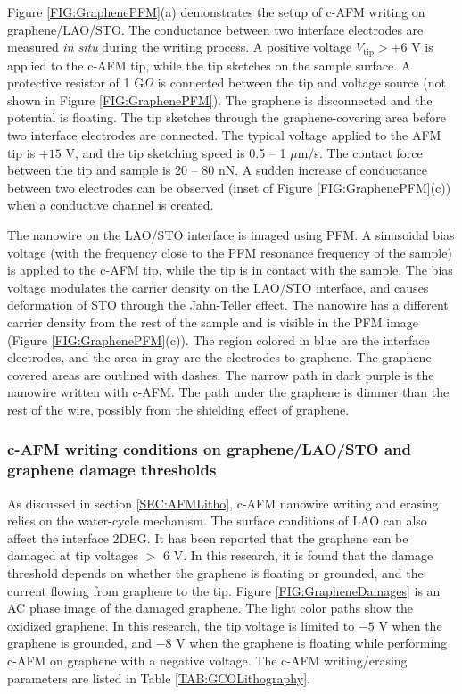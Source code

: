 \documentclass[pdflatex, sectionletters, 12pt, final, phd]{pittetd}    %
\begin{document}
Figure \ref{FIG:GraphenePFM}(a) demonstrates the setup of c-AFM writing on graphene/LAO/STO. The conductance between two interface electrodes are measured \textit{in situ} during the writing process. A positive voltage $V_\mathrm{tip} > +6$ V is applied to the c-AFM tip, while the tip sketches on the sample surface. A protective resistor of 1 G$\Omega$ is connected between the tip and voltage source (not shown in Figure \ref{FIG:GraphenePFM}). The graphene is disconnected and the potential is floating. The tip sketches through the graphene-covering area before two interface electrodes are connected. The typical voltage applied to the AFM tip is $+15$ V, and the tip sketching speed is 0.5 -- 1 $\mu$m/s. The contact force between the tip and sample is 20 -- 80 nN. A sudden increase of conductance between two electrodes can be observed (inset of Figure \ref{FIG:GraphenePFM}(c)) when a conductive channel is created. 

The nanowire on the LAO/STO interface is imaged using PFM. A sinusoidal bias voltage (with the frequency close to the PFM resonance frequency of the sample) is applied to the c-AFM tip, while the tip is in contact with the sample. The bias voltage modulates the carrier density on the LAO/STO interface, and causes deformation of STO through the Jahn-Teller effect\cite{huang2013direct, vonk2007interface, salluzzo2009orbital, park2006charge}. The nanowire has a different carrier density from the rest of the sample and is visible in the PFM image (Figure \ref{FIG:GraphenePFM}(c)). The region colored in blue are the interface electrodes, and the area in gray are the electrodes to graphene. The graphene covered areas are outlined with dashes. The narrow path in dark purple is the nanowire written with c-AFM. The path under the graphene is dimmer than the rest of the wire, possibly from the shielding effect of graphene.

\subsubsection{c-AFM writing conditions on graphene/LAO/STO and graphene damage thresholds}

As discussed in section \ref{SEC:AFMLitho}, c-AFM nanowire writing and erasing relies on the water-cycle mechanism. The surface conditions of LAO can also affect the interface 2DEG\cite{brown2016giant, xie2011control, xie2013enhancing, aliaj2018probing}. It has been reported\cite{alaboson2011conductive} that the graphene can be damaged at tip voltages $>$ 6 V. In this research, it is found that the damage threshold depends on whether the graphene is floating or grounded, and the current flowing from graphene to the tip. Figure \ref{FIG:GrapheneDamages} is an AC phase image of the damaged graphene. The light color paths show the oxidized graphene. In this research, the tip voltage is limited to $-5$ V when the graphene is grounded, and $-8$ V when the graphene is floating while performing c-AFM on graphene with a negative voltage. The c-AFM writing/erasing parameters are listed in Table \ref{TAB:GCOLithography}.
\end{document}
